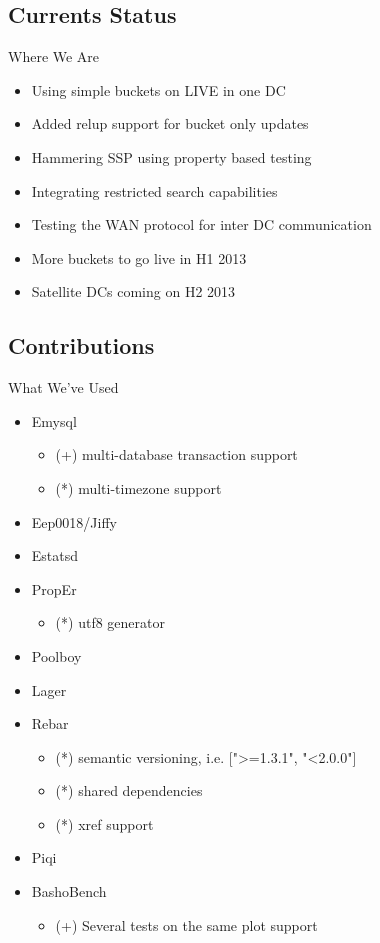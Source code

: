 \documentclass[aspectratio=169]{beamer}
\begin{document}
\subsection{Currents Status}
\begin{frame}{Where We Are}
    \begin{itemize}
        \item Using simple buckets on LIVE in one DC
        \item Added relup support for bucket only updates
        \item Hammering SSP using property based testing
        \item Integrating restricted search capabilities
        \item Testing the WAN protocol for inter DC communication
        \item More buckets to go live in H1 2013
        \item Satellite DCs coming on H2 2013
    \end{itemize}
\end{frame}

\subsection{Contributions}
\begin{frame}{What We've Used}
    \begin{itemize}
        \item Emysql
            \begin{itemize}
                \item (+) multi-database transaction support
                \item (*) multi-timezone support
            \end{itemize}
        \item Eep0018/Jiffy
        \item Estatsd
        \item PropEr
            \begin{itemize}
                \item (*) utf8 generator
            \end{itemize}
        \item Poolboy
        \item Lager
        \item Rebar
            \begin{itemize}
                \item (*) semantic versioning, i.e. [">=1.3.1", "<2.0.0"]
                \item (*) shared dependencies
                \item (*) xref support
            \end{itemize}
        \item Piqi
        \item BashoBench
            \begin{itemize}
                \item (+) Several tests on the same plot support
            \end{itemize}
    \end{itemize}
\end{frame}
\end{document}
